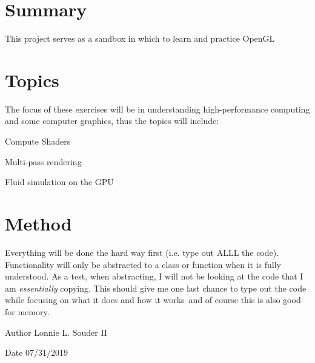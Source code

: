 \hypertarget{index_Summary}{}\section{Summary}\label{index_Summary}
This project serves as a sandbox in which to learn and practice Open\+GL\hypertarget{index_Main}{}\section{Topics}\label{index_Main}
The focus of these exercises will be in understanding high-\/performance computing and some computer graphics, thus the topics will include\+:
\begin{DoxyItemize}
\item Compute Shaders
\item Multi-\/pass rendering
\item Fluid simulation on the G\+PU
\end{DoxyItemize}\hypertarget{index_My}{}\section{Method}\label{index_My}
Everything will be done the hard way first (i.\+e. type out A\+L\+LL the code). Functionality will only be abstracted to a class or function when it is fully understood. As a test, when abstracting, I will not be looking at the code that I am {\itshape essentially} copying. This should give me one last chance to type out the code while focusing on what it does and how it works--and of course this is also good for memory.

\begin{DoxyAuthor}{Author}
Lonnie L. Souder II 
\end{DoxyAuthor}
\begin{DoxyDate}{Date}
07/31/2019 
\end{DoxyDate}
